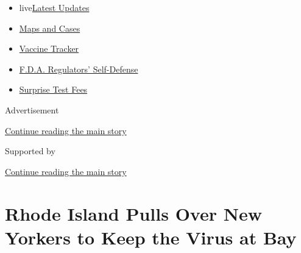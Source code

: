 \begin{itemize}
\tightlist
\item
  live\href{https://www.nytimes3xbfgragh.onion/2020/09/11/world/covid-19-coronavirus.html?name=styln-coronavirus-national\&region=TOP_BANNER\&block=storyline_menu_recirc\&action=click\&pgtype=Article\&impression_id=e83e2001-f4cd-11ea-bbde-33ae2248a786\&variant=undefined}{Latest
  Updates}
\item
  \href{https://www.nytimes3xbfgragh.onion/interactive/2020/us/coronavirus-us-cases.html?name=styln-coronavirus-national\&region=TOP_BANNER\&block=storyline_menu_recirc\&action=click\&pgtype=Article\&impression_id=e83e2002-f4cd-11ea-bbde-33ae2248a786\&variant=undefined}{Maps
  and Cases}
\item
  \href{https://www.nytimes3xbfgragh.onion/interactive/2020/science/coronavirus-vaccine-tracker.html?name=styln-coronavirus-national\&region=TOP_BANNER\&block=storyline_menu_recirc\&action=click\&pgtype=Article\&impression_id=e83e2003-f4cd-11ea-bbde-33ae2248a786\&variant=undefined}{Vaccine
  Tracker}
\item
  \href{https://www.nytimes3xbfgragh.onion/2020/09/10/us/politics/fda-coronavirus-vaccine.html?name=styln-coronavirus-national\&region=TOP_BANNER\&block=storyline_menu_recirc\&action=click\&pgtype=Article\&impression_id=e83e2004-f4cd-11ea-bbde-33ae2248a786\&variant=undefined}{F.D.A.
  Regulators' Self-Defense}
\item
  \href{https://www.nytimes3xbfgragh.onion/2020/09/09/upshot/coronavirus-surprise-test-fees.html?name=styln-coronavirus-national\&region=TOP_BANNER\&block=storyline_menu_recirc\&action=click\&pgtype=Article\&impression_id=e83e2005-f4cd-11ea-bbde-33ae2248a786\&variant=undefined}{Surprise
  Test Fees}
\end{itemize}

Advertisement

\protect\hyperlink{after-top}{Continue reading the main story}

Supported by

\protect\hyperlink{after-sponsor}{Continue reading the main story}

\hypertarget{rhode-island-pulls-over-new-yorkers-to-keep-the-virus-at-bay}{%
\section{Rhode Island Pulls Over New Yorkers to Keep the Virus at
Bay}\label{rhode-island-pulls-over-new-yorkers-to-keep-the-virus-at-bay}}

